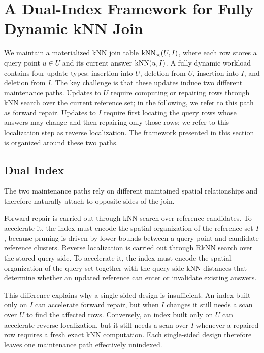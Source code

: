 \section{A Dual-Index Framework for Fully Dynamic kNN Join}
\label{sec:framework}

We maintain a materialized kNN join table $\operatorname{kNN}_{\bowtie}(U,I)$, where each row stores a query point $u\in U$ and its current answer $\operatorname{kNN}(u,I)$. A fully dynamic workload contains four update types: insertion into $U$, deletion from $U$, insertion into $I$, and deletion from $I$. The key challenge is that these updates induce two different maintenance paths. Updates to $U$ require computing or repairing rows through kNN search over the current reference set; in the following, we refer to this path as forward repair. Updates to $I$ require first locating the query rows whose answers may change and then repairing only those rows; we refer to this localization step as reverse localization. The framework presented in this section is organized around these two paths.

\subsection{Dual Index}
\label{subsec:framework-why-dual}

The two maintenance paths rely on different maintained spatial relationships and therefore naturally attach to opposite sides of the join.

Forward repair is carried out through kNN search over reference candidates. To accelerate it, the index must encode the spatial organization of the reference set $I$, because pruning is driven by lower bounds between a query point and candidate reference clusters. Reverse localization is carried out through RkNN search over the stored query side. To accelerate it, the index must encode the spatial organization of the query set together with the query-side kNN distances that determine whether an updated reference can enter or invalidate existing answers.

This difference explains why a single-sided design is insufficient. An index built only on $I$ can accelerate forward repair, but when $I$ changes it still needs a scan over $U$ to find the affected rows. Conversely, an index built only on $U$ can accelerate reverse localization, but it still needs a scan over $I$ whenever a repaired row requires a fresh exact kNN computation. Each single-sided design therefore leaves one maintenance path effectively unindexed.

